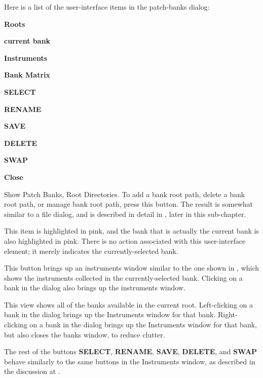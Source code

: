    Here is a list of the user-interface items in the patch-banks dialog:

   \begin{enumber}
      \item \textbf{Roots}
      \item \textbf{current bank}
      \item \textbf{Instruments}
      \item \textbf{Bank Matrix}
      \item \textbf{SELECT}
      \item \textbf{RENAME}
      \item \textbf{SAVE}
      \item \textbf{DELETE}
      \item \textbf{SWAP}
      \item \textbf{Close}
   \end{enumber}

   \setcounter{ItemCounter}{0}      %

   Show Patch Banks, Root Directories.
   To add a bank root path, delete a bank root path, or manage bank root path,
   press this button.  The result is somewhat similar to a file dialog,
   and is described in detail in 
   , later in
   this sub-chapter.

   This item is highlighted in pink, and the bank that is actually the current
   bank is also highlighted in pink.  There is no action associated with this
   user-interface element; it merely indicates the currently-selected bank.

   This button brings up an instruments window similar
   to the one shown in
   , which shows
   the instruments collected in the currently-selected bank.
   Clicking on a bank in the dialog also brings up the instruments window.

   This view shows all of the banks available in the current root.
   Left-clicking on a bank in the dialog brings up the Instruments window for
   that bank.
   Right-clicking on a bank in the dialog brings up the Instruments window for
   that bank, but also closes the banks window, to reduce clutter.

   The rest of the buttons \textbf{SELECT}, \textbf{RENAME}, \textbf{SAVE},
   \textbf{DELETE}, and \textbf{SWAP} behave similarly to the same buttons in
   the Instruments window, as
   described in the discussion at
   .

